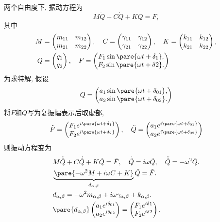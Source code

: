 \documentclass[../LectureNotes.tex]{subfiles}
\begin{document}
两个自由度下, 振动方程为
\[ M\ddot{Q} + C\dot{Q} + KQ = F, \]
其中
\begin{align*}
    M &= \begin{pmatrix}
    m_{11} & m_{12} \\
    m_{21} & m_{22}
\end{pmatrix},\quad C = \begin{pmatrix}
    \gamma_{11} & \gamma_{12} \\
    \gamma_{21} & \gamma_{22}
\end{pmatrix},\quad K = \begin{pmatrix}
    k_{11} & k_{12} \\
    k_{21} & k_{22}
\end{pmatrix},\\ Q &= \begin{pmatrix}
    q_1 \\ q_2
\end{pmatrix},\quad F = \begin{pmatrix}
    F_1 \sin \pare{\omega t + \delta_1}, \\
    F_2 \sin \pare{\omega t + \delta 2}.
\end{pmatrix}
\end{align*}
为求特解, 假设
\[ Q = \begin{pmatrix}
    a_1 \sin\pare{\omega t + \delta_{01}}, \\
    a_2 \sin\pare{\omega t + \delta_{02}}.
\end{pmatrix} \]
将$F$和$Q$写为复振幅表示后取虚部,
\[ \tilde{F} = \begin{pmatrix}
    F_1 e^{i\pare{\omega t + \delta_1}} \\
    F_2 e^{i\pare{\omega t + \delta_2}}
\end{pmatrix},\quad \tilde{Q} = \begin{pmatrix}
    a_1 e^{i\pare{\omega t + \delta_{01}}} \\
    a_2 e^{i\pare{\omega t + \delta_{02}}}
\end{pmatrix}
\]
则振动方程变为
\begin{align*}
    & M\ddot{\tilde{Q}} + C\dot{\tilde{Q}} + K\tilde{Q} = \tilde{F},\quad \dot{\tilde{Q}} = i\omega\tilde{Q},\quad \ddot{\tilde{Q}} = -\omega^2 \tilde{Q}. \\
    & \underbrace{\pare{-\omega^2 M + i\omega C + K}}_{d_{\alpha,\beta}}\tilde{Q} = \tilde{F}. \\
    & d_{\alpha,\beta} = -\omega^2 m_{\alpha,\beta} + i\omega \gamma_{\alpha,\beta} + k_{\alpha,\beta}. \\
    & \pare{d_{\alpha,\beta}} \begin{pmatrix}
        a_1 e^{i\delta_{01}} \\
        a_2 e^{i\delta_{02}}
    \end{pmatrix} = \begin{pmatrix}
        F_1 e^{i\delta 1} \\
        F_2 e^{i\delta 2}
    \end{pmatrix}.
\end{align*}
\end{document}
